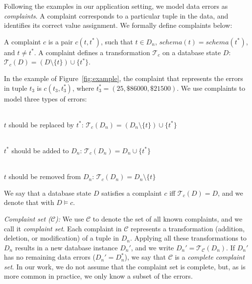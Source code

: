 Following the examples in our application setting, we model data errors as
\emph{complaints}. A complaint corresponds to a particular tuple in the data,
and identifies its correct value assignment. We formally define complaints
below:

\begin{definition}[Complaint]
    A complaint $c$ is a pair $c(t,t^*)$, such that $t\in D_n$,
    $schema(t)=schema(t^*)$, and $t\neq t^*$. A complaint defines a
    transformation $\mathcal{T}_c$ on a database state $D$: $\mathcal{T}_c(D)
    = (D\setminus\{t\})\cup\{t^*\}$.
\end{definition}

In the example of Figure~\ref{fig:example}, the complaint that represents the
errors in tuple $t_3$ is $c(t_3,t_3^*)$, where $t_3^*=(25,\$86000,\$21500)$.
We use complaints to model three types of errors:

\begin{description}[itemsep=0pt, parsep=0pt]
    \item[Incorrect values $\mathbf{c(t,t^*)}$]\strut\\
     $t$ should be replaced by $t^*$: $\mathcal{T}_c(D_n) =
     (D_n\setminus\{t\})\cup\{t^*\}$
    
    \item[Missing tuples $\mathbf{c(\_,t^*)}$]\strut\\ 
    $t^*$ should be added to
    $D_n$: $\mathcal{T}_c(D_n) = D_n\cup\{t^*\}$
    
    \item[Present tuples $\mathbf{c(t,\_)}$]\strut\\ 
    $t$ should be removed from
    $D_n$: $\mathcal{T}_c(D_n) = D_n\setminus\{t\}$
\end{description}

\begin{definition}
    We say that a database state $D$ satisfies a complaint $c$ iff $\mathcal{T}_c(D) = D$, and we denote that with $D\models c$.
\end{definition}
% 
\emph{Complaint set ($\mathcal{C}$):}
We use $\mathcal{C}$ to denote the set of all known complaints, and we call it
\emph{complaint set}. Each complaint in $\mathcal{C}$ represents a
transformation (addition, deletion, or modification) of a tuple in $D_n$.
Applying all these transformations to $D_n$ results in a new database instance
$D_n'$, and we write $D_n'=\mathcal{T}_\mathcal{C}(D_n)$. If $D_n'$ has no
remaining data errors ($D_n'=D_n^*$), we say that $\mathcal{C}$ is a
\emph{complete complaint set}.
In our work, we do not assume that the complaint set is complete, but, as is
more common in practice, we only know a subset of the errors.

